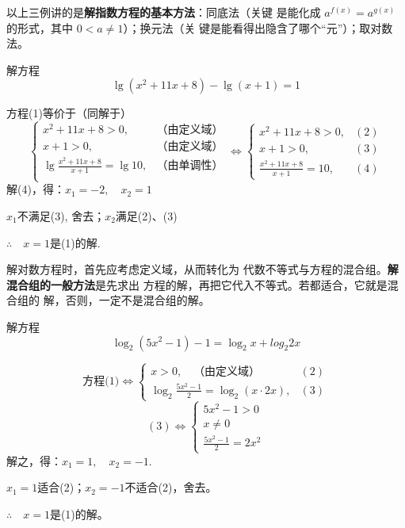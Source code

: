 以上三例讲的是\textbf{解指数方程的基本方法}：同底法（关键
是能化成
$a^{f(x)}=a^{g(x)}$
的形式，其中
$0<a\ne 1$）；换元法（关
键是能看得出隐含了哪个“元”）；取对数法。

\begin{example}
  解方程
  \begin{equation}
 \lg(x^2+11x+8)-\lg(x+1)=1\tag{1}     
  \end{equation}
\end{example}

\begin{solution}
    方程(1)等价于（同解于）
\[\begin{cases}
    x^2+11x+8>0,&\text{（由定义域）}\\
    x+1>0,&\text{（由定义域）}\\
    \lg\frac{x^2+11x+8}{x+1}=\lg10,&\text{（由单调性）}\\
\end{cases}\Longleftrightarrow \begin{cases}
    x^2+11x+8>0,&(2)\\
    x+1>0,&(3)\\
    \frac{x^2+11x+8}{x+1}=10,&(4)
\end{cases}\]
解(4)，得：$x_1=-2,\quad x_2=1$

$x_1$不满足(3), 舍去；$x_2$满足(2)、(3)

$\therefore\quad x=1$是(1)的解.
\end{solution}

\begin{note}
    解对数方程时，首先应考虑定义域，从而转化为
代数不等式与方程的混合组。\textbf{解混合组的一般方法}是先求出
方程的解，再把它代入不等式。若都适合，它就是混合组的
解，否则，一定不是混合组的解。
\end{note}

\begin{example}
    解方程
    \begin{equation}
\log_2(5x^2-1)-1=\log_2 x+log_2 2x \tag{1}
    \end{equation}
\end{example}

\begin{solution}
\[\text{方程(1)}\Longleftrightarrow\begin{cases}
    x>0, \quad \text{（由定义域）}& (2)\\
    \log_2\frac{5x^2-1}{2}=\log_2(x\cdot 2x), &(3)
\end{cases}\]
\[(3)\Longleftrightarrow \begin{cases}
    5x^2-1>0\\
    x\ne 0\\
    \frac{5x^2-1}{2}=2x^2
\end{cases}\]
解之，得：$x_1=1,\quad x_2=-1$.

$x_1=1$适合(2)；$x_2=-1$不适合(2)，舍去。

$\therefore\quad x=1$是(1)的解。
\end{solution}



